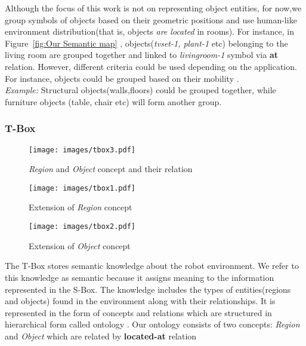 Although the focus of this work is not on representing object entities, for now,we group symbols of objects based on their geometric positions and 
use human-like environment distribution(that is, objects \textit{are located} in rooms)\cite{3}.
For instance, in Figure~\ref{fig:Our Semantic map} , objects(\textit{tvset-1, plant-1} etc) belonging to the living room are grouped together and linked to \textit{livingroom-1} symbol via \textbf{at} relation.
However, different criteria could be used depending on the application. For instance, objects could be grouped based on their mobility \cite{21, 22}.\\
\textit{Example:} Structural objects(walls,floors) could be grouped together, while furniture objects
(table, chair etc) will form another group.


\subsubsection{T-Box}
\begin{figure}[htbp] %
   \centering
   \texttt{[image: images/tbox3.pdf]}
   \caption{\textit{Region} and \textit{Object} concept and their relation}
   \label{fig:T-Box}
\end{figure}
\begin{figure}[htbp] %
   \centering
   \texttt{[image: images/tbox1.pdf]}
   \caption{Extension of \textit{Region} concept}
   \label{fig:TBox2}
\end{figure}
\begin{figure}[htbp] %
   \centering
   \texttt{[image: images/tbox2.pdf]}
   \caption{Extension of \textit{Object} concept}
   \label{fig:TBox1}
\end{figure}
The T-Box stores semantic knowledge about the robot environment. 
We refer to this knowledge as semantic because it assigns meaning to the information represented in the S-Box.
The knowledge includes the types of entities(regions and objects) found in the environment along with their relationships.
It is represented in the form of concepts and relations which are structured in hierarchical form called ontology \cite{2}.
Our ontology consists of two concepts: \textit{Region} and \textit{Object} which are related by \textbf{located-at} relation 
